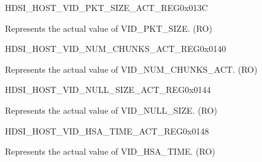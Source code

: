 \begin{register}{H}{DSI\_HOST\_VID\_PKT\_SIZE\_ACT\_REG}{0x013C}\label{regdesc:DSIHOSTVIDPKTSIZEACTREG}
%
%
\regnewline%
\begin{regdesc}\begin{reglist}
\label{fielddesc:DSIHOSTVIDPKTSIZEACT}\item [DSI\_HOST\_VID\_PKT\_SIZE\_ACT] Represents the actual value of VID\_PKT\_SIZE. (RO)
\end{reglist}\end{regdesc}
\end{register}


\begin{register}{H}{DSI\_HOST\_VID\_NUM\_CHUNKS\_ACT\_REG}{0x0140}\label{regdesc:DSIHOSTVIDNUMCHUNKSACTREG}
%
%
\regnewline%
\begin{regdesc}\begin{reglist}
\label{fielddesc:DSIHOSTVIDNUMCHUNKSACT}\item [DSI\_HOST\_VID\_NUM\_CHUNKS\_ACT] Represents the actual value of VID\_NUM\_CHUNKS\_ACT. (RO)
\end{reglist}\end{regdesc}
\end{register}


\begin{register}{H}{DSI\_HOST\_VID\_NULL\_SIZE\_ACT\_REG}{0x0144}\label{regdesc:DSIHOSTVIDNULLSIZEACTREG}
%
%
\regnewline%
\begin{regdesc}\begin{reglist}
\label{fielddesc:DSIHOSTVIDNULLSIZEACT}\item [DSI\_HOST\_VID\_NULL\_SIZE\_ACT] Represents the actual value of VID\_NULL\_SIZE. (RO)
\end{reglist}\end{regdesc}
\end{register}


\begin{register}{H}{DSI\_HOST\_VID\_HSA\_TIME\_ACT\_REG}{0x0148}\label{regdesc:DSIHOSTVIDHSATIMEACTREG}
%
%
\regnewline%
\begin{regdesc}\begin{reglist}
\label{fielddesc:DSIHOSTVIDHSATIMEACT}\item [DSI\_HOST\_VID\_HSA\_TIME\_ACT] Represents the actual value of VID\_HSA\_TIME. (RO)
\end{reglist}\end{regdesc}
\end{register}


